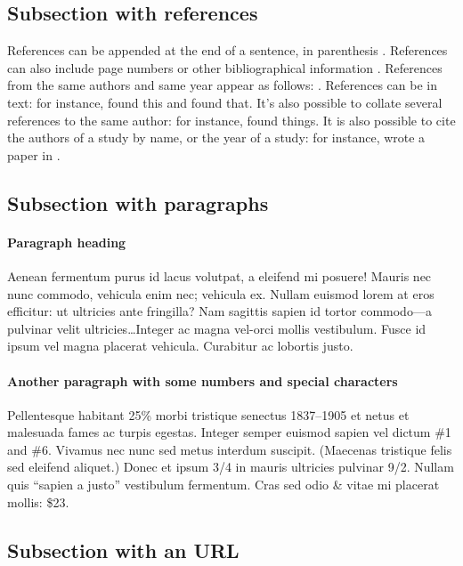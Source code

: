 \documentclass[letterpaper,11pt,leqno]{article}
\begin{document}
\subsection{Subsection with references} 

References can be appended at the end of a sentence, in parenthesis \citep{MS15}. References can also include page numbers or other bibliographical information \citep[p. 1305]{MS19}. References from the same authors and same year appear as follows: \citep{LMS18a,LMS18b}. References can be in text: for instance, \citet{M12} found this and \citet[figure 1]{M14} found that. It's also possible to collate several references to the same author: for instance, \citet{M12,M14} found things. It is also possible to cite the authors of a study by name, or the year of a study: for instance, \citeauthor{EMM21} wrote a paper in \citeyear{EMM21}.

\subsection{Subsection with paragraphs}

\paragraph{Paragraph heading} Aenean fermentum purus id lacus volutpat, a eleifend mi posuere! Mauris nec nunc commodo, vehicula enim nec; vehicula ex. Nullam euismod lorem at eros efficitur: ut ultricies ante fringilla? Nam sagittis sapien id tortor commodo---a pulvinar velit ultricies\ldots Integer ac magna vel-orci mollis vestibulum. Fusce id ipsum vel magna placerat vehicula. Curabitur ac lobortis justo. 

\paragraph{Another paragraph with some numbers and special characters} Pellentesque habitant 25\% morbi tristique senectus 1837--1905 et netus et malesuada fames ac turpis egestas. Integer semper euismod sapien vel dictum \#1 and \#6. Vivamus nec nunc sed metus interdum suscipit. (Maecenas tristique felis sed eleifend aliquet.) Donec et ipsum 3/4 in mauris ultricies pulvinar 9/2. Nullam quis ``sapien a justo'' vestibulum fermentum. Cras sed odio \& vitae mi placerat mollis: \$23.

\subsection{Subsection with an URL}
\end{document}
